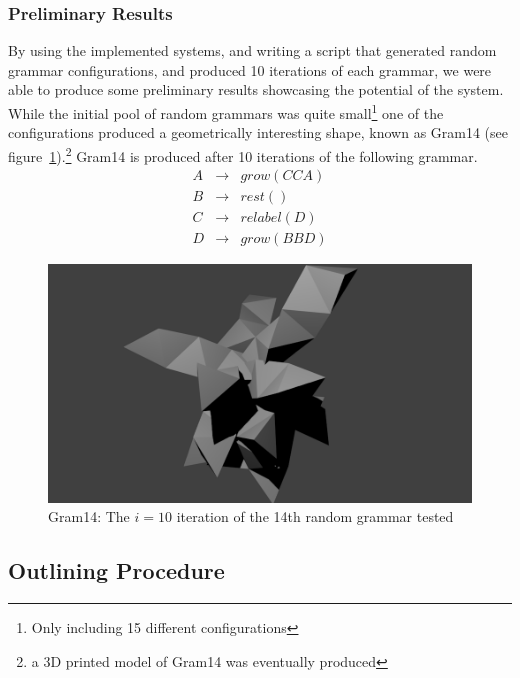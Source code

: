 \documentclass[condensed]{union-cs-thesis}
\begin{document}
\subsubsection{Preliminary Results}
\par
By using the implemented systems, and writing a script that generated random grammar configurations, and produced 10 iterations of each grammar, we were able to produce some preliminary results showcasing the potential of the system.  While the initial pool of random grammars was quite small\footnote{Only including 15 different configurations} one of the configurations produced a geometrically interesting shape, known as Gram14 (see figure~\ref{fig:gram14}).\footnote{a 3D printed model of Gram14 was eventually produced}  Gram14 is produced after 10 iterations of the following grammar.
\begin{displaymath}
  \begin{matrix}
    A & \to & grow(CCA)  \\
    B & \to & rest()     \\
    C & \to & relabel(D) \\
    D & \to & grow(BBD)
  \end{matrix}
\end{displaymath}

\begin{figure}[h]
  \centering
  \includegraphics[width=.75\textwidth]{gram14}
  \caption{Gram14: The $i=10$ iteration of the 14th random grammar tested}
  \label{fig:gram14}
\end{figure}


\subsection{Outlining Procedure}
\end{document}
